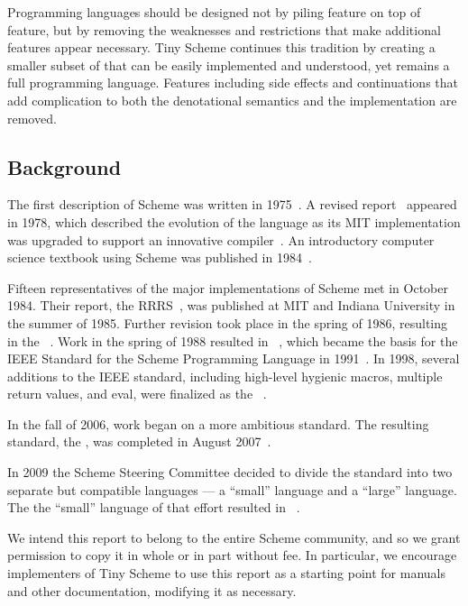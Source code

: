 
\label{historysection}

Programming languages should be designed not by piling feature on top
of feature, but by removing the weaknesses and restrictions that make
additional features appear necessary.  Tiny Scheme continues this
tradition by creating a smaller subset of \rsevenrs{} that can be easily
implemented and understood, yet remains a full programming
language. Features including side effects and continuations that add
complication to both the denotational semantics and the implementation
are removed.


\subsection*{Background}

\vest The first description of Scheme was written in
1975~\cite{Scheme75}.  A revised report~\cite{Scheme78}
appeared in 1978, which described the evolution
of the language as its MIT implementation was upgraded to support an
innovative compiler~\cite{Rabbit}. An introductory
computer science textbook using Scheme was published in
1984~\cite{SICP}.

\vest Fifteen representatives of the major implementations of Scheme
met in October 1984.
Their report, the RRRS~\cite{RRRS},
was published at MIT and Indiana University in the summer of 1985.
Further revision took place in the spring of 1986, resulting in the
\rthreers~\cite{R3RS}.
Work in the spring of 1988 resulted in \rfourrs~\cite{R4RS},
which became the basis for the
IEEE Standard for the Scheme Programming Language in 1991~\cite{IEEEScheme}.
In 1998, several additions to the IEEE standard, including high-level
hygienic macros, multiple return values, and {\cf eval}, were finalized
as the \rfivers~\cite{R5RS}.

In the fall of 2006, work began on a more ambitious standard.
The resulting standard, the
\rsixrs, was completed in August 2007~\cite{R6RS}.

In 2009 the Scheme Steering Committee decided to divide the
standard into two separate but compatible languages --- a ``small''
language and a ``large'' language.
The the ``small'' language of that effort resulted in \rsevenrs~\cite{R7RS}.


\medskip

We intend this report to belong to the entire Scheme community, and so
we grant permission to copy it in whole or in part without fee.  In
particular, we encourage implementers of Tiny Scheme to use this report as
a starting point for manuals and other documentation, modifying it as
necessary.




